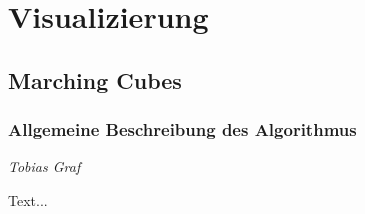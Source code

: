 \chapter{Visualizierung}
\label{chap:visualisierung}
\thispagestyle{empty}

\section{Marching Cubes}
\subsection{Allgemeine Beschreibung des Algorithmus}

\begin{center}
\emph{{\small Tobias Graf}}
\end{center}

\bigskip

Text...
